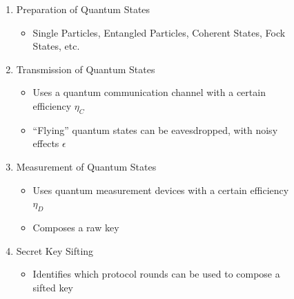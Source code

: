 \documentclass{beamer}
\begin{document}
\begin{frame}
\begin{figure}
\begin{minipage}{0.4\textwidth}
                    \caption{\color{blue}{Figure 2: }\color{black}{Flowchart of a QKD protocol}}
                    \label{fig:qkd-protocol-flowchart-1}
                \end{minipage}%
                \hspace{0.05\textwidth}%
                \begin{minipage}{0.55\textwidth}
                    \begin{enumerate}\footnotesize
                        \item Preparation of Quantum States
                        \begin{itemize}\scriptsize
                            \item Single Particles, Entangled Particles, Coherent States, Fock States, etc.
                        \end{itemize}
                        \item Transmission of Quantum States
                        \begin{itemize}\scriptsize
                            \item Uses a quantum communication channel with a certain efficiency ${\eta}_{C}$
                            \item ``Flying'' quantum states can be eavesdropped, with noisy effects $\epsilon$
                        \end{itemize}
                        \item Measurement of Quantum States
                        \begin{itemize}\scriptsize
                            \item Uses quantum measurement devices with a certain efficiency ${\eta}_{D}$
                            \item Composes a raw key
                        \end{itemize}
                        \item Secret Key Sifting
                        \begin{itemize}\scriptsize
                            \item Identifies which protocol rounds can be used to compose a sifted key
                        \end{itemize}
                    \end{enumerate}
                \end{minipage}
            \end{figure}
   
		\end{frame}
  
\end{document}
